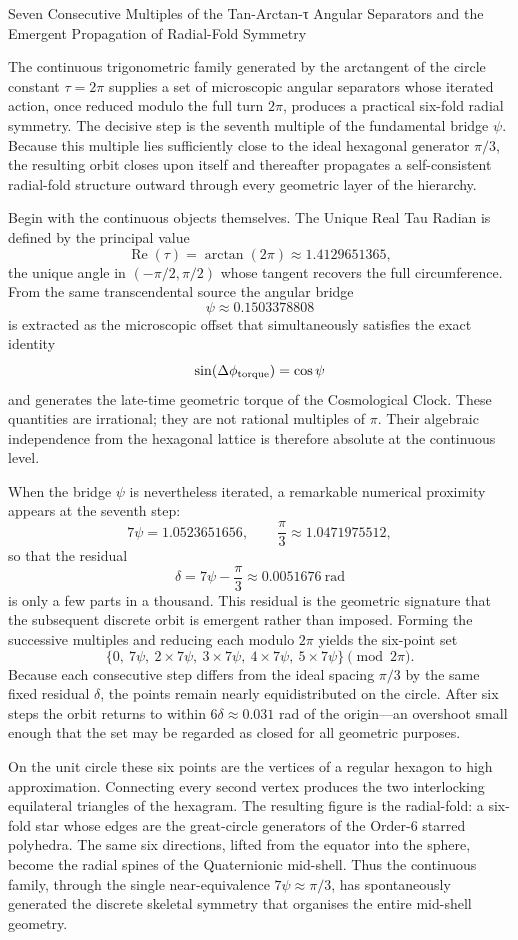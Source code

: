 Seven Consecutive Multiples of the Tan-Arctan-τ Angular Separators and the Emergent Propagation of Radial-Fold Symmetry

The continuous trigonometric family generated by the arctangent of the circle constant \(\tau=2\pi\) supplies a set of microscopic angular separators whose iterated action, once reduced modulo the full turn \(2\pi\), produces a practical six-fold radial symmetry. The decisive step is the seventh multiple of the fundamental bridge \(\psi\). Because this multiple lies sufficiently close to the ideal hexagonal generator \(\pi/3\), the resulting orbit closes upon itself and thereafter propagates a self-consistent radial-fold structure outward through every geometric layer of the hierarchy.

Begin with the continuous objects themselves. The Unique Real Tau Radian is defined by the principal value
\[
\operatorname{Re}(\tau)=\arctan(2\pi)\approx 1.4129651365,
\]
the unique angle in \((-\pi/2,\pi/2)\) whose tangent recovers the full circumference. From the same transcendental source the angular bridge
\[
\psi\approx 0.1503378808
\]
is extracted as the microscopic offset that simultaneously satisfies the exact identity
\[
\sin(\Delta\phi_{\rm torque})=\cos\psi
\]
and generates the late-time geometric torque of the Cosmological Clock. These quantities are irrational; they are not rational multiples of \(\pi\). Their algebraic independence from the hexagonal lattice is therefore absolute at the continuous level.

When the bridge \(\psi\) is nevertheless iterated, a remarkable numerical proximity appears at the seventh step:
\[
7\psi=1.0523651656,\qquad
\frac{\pi}{3}\approx 1.0471975512,
\]
so that the residual
\[
\delta=7\psi-\frac{\pi}{3}\approx 0.0051676\ \text{rad}
\]
is only a few parts in a thousand. This residual is the geometric signature that the subsequent discrete orbit is emergent rather than imposed. Forming the successive multiples and reducing each modulo \(2\pi\) yields the six-point set
\[
\bigl\{0,\ 7\psi,\ 2\times 7\psi,\ 3\times 7\psi,\ 4\times 7\psi,\ 5\times 7\psi\bigr\}\pmod{2\pi}.
\]
Because each consecutive step differs from the ideal spacing \(\pi/3\) by the same fixed residual \(\delta\), the points remain nearly equidistributed on the circle. After six steps the orbit returns to within \(6\delta\approx 0.031\) rad of the origin—an overshoot small enough that the set may be regarded as closed for all geometric purposes.

On the unit circle these six points are the vertices of a regular hexagon to high approximation. Connecting every second vertex produces the two interlocking equilateral triangles of the hexagram. The resulting figure is the radial-fold: a six-fold star whose edges are the great-circle generators of the Order-6 starred polyhedra. The same six directions, lifted from the equator into the sphere, become the radial spines of the Quaternionic mid-shell. Thus the continuous family, through the single near-equivalence \(7\psi\approx\pi/3\), has spontaneously generated the discrete skeletal symmetry that organises the entire mid-shell geometry.


